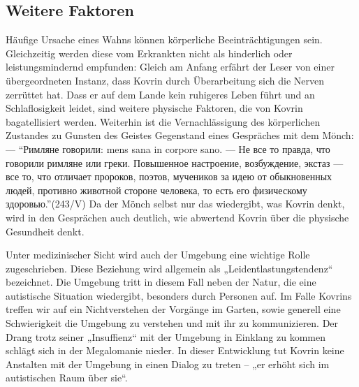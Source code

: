 \documentclass[12pt,headsepline,a4paper]{scrartcl}
\newcommand\textcyr[1]{{\fontencoding{OT2}\fontfamily{wncyr}\selectfont ``#1''}}
\begin{document}
\subsection{Weitere Faktoren}
Häufige Ursache eines Wahns können körperliche Beeinträchtigungen sein. Gleichzeitig
werden diese vom Erkrankten nicht als hinderlich oder leistungsmindernd empfunden\autocite[85]{avenarius}: Gleich am
Anfang erfährt der Leser von einer übergeordneten Instanz, dass Kovrin durch Überarbeitung sich die
Nerven zerrüttet hat. Dass er auf dem Lande kein ruhigeres Leben führt und an Schlaflosigkeit
leidet, sind weitere physische Faktoren, die von Kovrin bagatellisiert werden. Weiterhin ist die
Vernachlässigung des körperlichen Zustandes zu Gunsten des Geistes Gegenstand eines Gespräches
mit dem Mönch: — \textcyr{Римляне говорили: mens sana in corpore sano. — Не все то правда, что
говорили римляне или греки. Повышенное настроение, возбуждение, экстаз — все то, что
отличает пророков, поэтов, мучеников за идею от обыкновенных людей, противно животной
стороне человека, то есть его физическому здоровью.}(243/V) Da der Mönch selbst nur das
wiedergibt, was Kovrin denkt, wird in den Gesprächen auch deutlich, wie abwertend Kovrin über
die physische Gesundheit denkt.

Unter medizinischer Sicht wird auch der Umgebung eine wichtige Rolle zugeschrieben. Diese
Beziehung wird allgemein als „Leidentlastungstendenz“ bezeichnet. Die Umgebung tritt in diesem
Fall neben der Natur, die eine autistische Situation wiedergibt, besonders durch Personen auf. Im
Falle Kovrins treffen wir auf ein Nichtverstehen der Vorgänge im Garten, sowie generell eine
Schwierigkeit die Umgebung zu verstehen und mit ihr zu kommunizieren. Der Drang trotz seiner
„Insuffienz“ mit der Umgebung in Einklang zu kommen schlägt sich in der Megalomanie nieder. In
dieser Entwicklung tut Kovrin keine Anstalten mit der Umgebung in einen Dialog zu treten -- „er
erhöht sich im autistischen Raum über sie“\autocite[84]{avenarius}.
\end{document}

